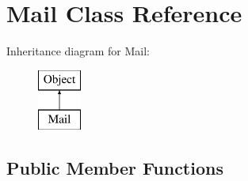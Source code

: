 \hypertarget{class_mail}{\section{Mail Class Reference}
\label{class_mail}
}
Inheritance diagram for Mail\-:\begin{figure}[H]
\begin{center}
\leavevmode
\includegraphics[height=2.000000cm]{class_mail}
\end{center}
\end{figure}
\subsection*{Public Member Functions}
